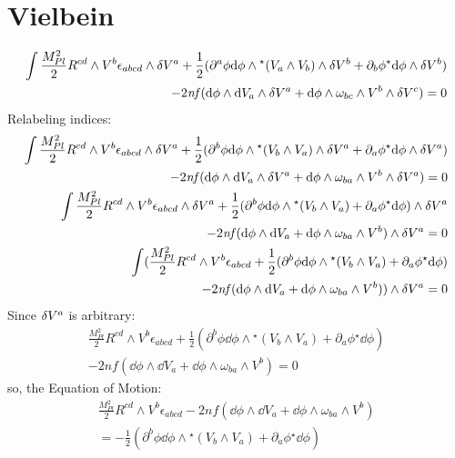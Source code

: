 \documentclass[12pt]{article}
\newcommand{\hodge}{{^\star}}
\begin{document}
\section{Vielbein}
\begin{align*}
  \int \frac{M_{Pl}^2}{2}R^{cd} \wedge V^b \epsilon_{abcd} \wedge \var V^a + \frac{1}{2}(\partial^a\phi \dd\phi \wedge \hodge(V_a \wedge V_b) \wedge \var{V^b} + \partial_b\phi \hodge\dd\phi \wedge \var{V^b}) \\ - 2\mathit{nf}(\dd\phi \wedge \dd V_a \wedge \var{V^a} + \dd\phi \wedge \omega_{bc} \wedge V^b \wedge \var{V^c}) = 0
\end{align*}
Relabeling indices:
\begin{align*}
  \int \frac{M_{Pl}^2}{2}R^{cd} \wedge V^b \epsilon_{abcd} \wedge \var V^a + \frac{1}{2}(\partial^b\phi \dd\phi \wedge \hodge(V_b \wedge V_a) \wedge \var{V^a} + \partial_a\phi \hodge\dd\phi \wedge \var{V^a}) \\ - 2\mathit{nf}(\dd\phi \wedge \dd V_a \wedge \var{V^a} + \dd\phi \wedge \omega_{ba} \wedge V^b \wedge \var{V^a}) = 0 \\
  \int \frac{M_{Pl}^2}{2}R^{cd} \wedge V^b \epsilon_{abcd} \wedge \var V^a + \frac{1}{2}(\partial^b\phi \dd\phi \wedge \hodge(V_b \wedge V_a) + \partial_a\phi \hodge\dd\phi) \wedge \var{V^a} \\ - 2\mathit{nf}(\dd\phi \wedge \dd V_a + \dd\phi \wedge \omega_{ba} \wedge V^b) \wedge \var{V^a} = 0 \\
  \int (\frac{M_{Pl}^2}{2}R^{cd} \wedge V^b \epsilon_{abcd} + \frac{1}{2}(\partial^b\phi \dd\phi \wedge \hodge(V_b \wedge V_a) + \partial_a\phi \hodge\dd\phi) \\ - 2\mathit{nf}(\dd\phi \wedge \dd V_a + \dd\phi \wedge \omega_{ba} \wedge V^b)) \wedge \var{V^a} = 0 \\
\end{align*}
Since $\var{V^a}$ is arbitrary:
\begin{align}
  \frac{M_{Pl}^2}{2}R^{cd} \wedge V^b \epsilon_{abcd} + \frac{1}{2}(\partial^b\phi \dd\phi \wedge \hodge(V_b \wedge V_a) + \partial_a\phi \hodge\dd\phi) \nonumber \\ - 2\mathit{nf}(\dd\phi \wedge \dd V_a + \dd\phi \wedge \omega_{ba} \wedge V^b) = 0
\end{align}
so, the Equation of Motion:
\begin{align}
  \frac{M_{Pl}^2}{2}R^{cd} \wedge V^b \epsilon_{abcd} - 2\mathit{nf}(\dd\phi \wedge \dd V_a + \dd\phi \wedge \omega_{ba} \wedge V^b) \nonumber \\ = - \frac{1}{2}(\partial^b\phi \dd\phi \wedge \hodge(V_b \wedge V_a) + \partial_a\phi \hodge\dd\phi)
\end{align}
\end{document}
